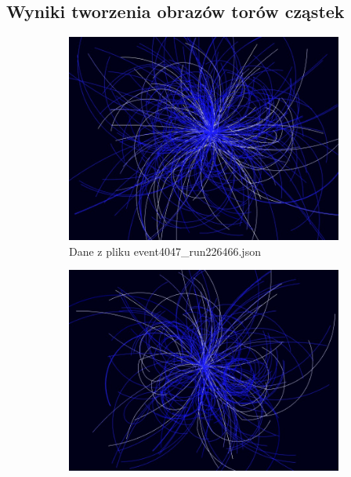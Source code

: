 \begin{appendices}
\renewcommand{\sectionname}{Załącznik}
\section{Wyniki tworzenia obrazów torów cząstek}
\label{Tory}
\begin{figure}[H]
	\begin{subfigure}{0.50\textwidth}
		\centering
 		\includegraphics[width=\textwidth]{TrackScreen7.jpg}
    	\caption{Dane z pliku event4047\_run226466.json}
 		\label{rys18}
	\end{subfigure}
	\hfill
	\begin{subfigure}{0.50\textwidth}
		\centering
		\includegraphics[width=\textwidth]{TrackScreen3.jpg}

\end{subfigure}
\end{figure}
\end{appendices}
